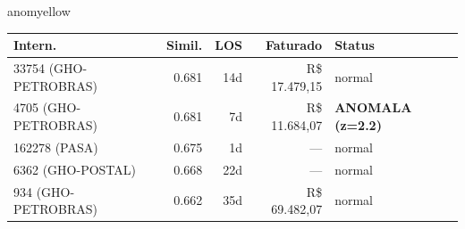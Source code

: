 \documentclass[a4paper,10pt]{article}
\begin{document}
\begin{anomalycard}[Internacao 47824 | GHO-PETROBRAS | MODERADO (z=2.48)]{anomyellow}
\begin{tabular}{l r r r l}\toprule\textbf{Intern.} & \textbf{Simil.} & \textbf{LOS} & \textbf{Faturado} & \textbf{Status} \\\midrule
33754 (GHO-PETROBRAS) & 0.681 & 14d & R\$ 17.479,15 & \textcolor{jcubeblue}{normal} \\
4705 (GHO-PETROBRAS) & 0.681 & 7d & R\$ 11.684,07 & \textcolor{anomred}{\textbf{ANOMALA (z=2.2)}} \\
162278 (PASA) & 0.675 & 1d & --- & \textcolor{jcubeblue}{normal} \\
6362 (GHO-POSTAL) & 0.668 & 22d & --- & \textcolor{jcubeblue}{normal} \\
934 (GHO-PETROBRAS) & 0.662 & 35d & R\$ 69.482,07 & \textcolor{jcubeblue}{normal} \\
\bottomrule\end{tabular}


\end{anomalycard}

\newpage
\end{document}
